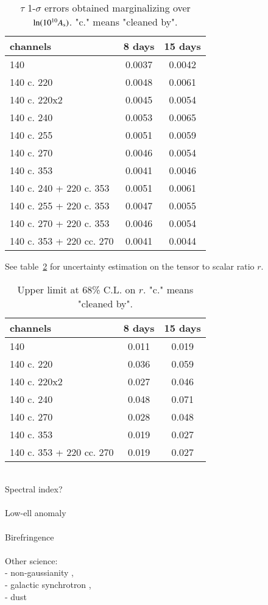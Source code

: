 \begin{table}[htp]
\begin{center}
\begin{tabular}{l|c|c}
channels & 8 days & 15 days \\
\hline
140 & 0.0037 & 0.0042\\
140 c. 220 & 0.0048 & 0.0061\\
140 c. 220x2 & 0.0045 & 0.0054\\
140 c. 240 & 0.0053 & 0.0065\\
140 c. 255 & 0.0051 & 0.0059\\
140 c. 270 & 0.0046 & 0.0054\\
140 c. 353 & 0.0041 & 0.0046\\
140 c. 240 + 220 c. 353  & 0.0051 & 0.0061\\
140 c. 255 + 220 c. 353  & 0.0047 & 0.0055\\
140 c. 270 + 220 c. 353  & 0.0046 & 0.0054\\
140 c. 353 + 220 cc. 270  & 0.0041 & 0.0044\\
\end{tabular}
\end{center}
\caption{$\tau$ 1-$\sigma$ errors obtained marginalizing over $\ln(10^{10}A_{\rm s})$. "c." means "cleaned by".
}
\label{tab:tauerrors}
\end{table}%

See table~\ref{tab:rerrors} for uncertainty estimation on the tensor to scalar ratio $r$. 

\begin{table}[htp]
\begin{center}
\begin{tabular}{l|c|c}
channels & 8 days & 15 days \\
\hline
140 & 0.011 & 0.019\\
140 c. 220 & 0.036 & 0.059\\
140 c. 220x2 & 0.027 & 0.046\\
140 c. 240 & 0.048 & 0.071\\
140 c. 270 & 0.028 & 0.048\\
140 c. 353 & 0.019 & 0.027\\
140 c. 353 + 220 cc. 270  & 0.019 & 0.027\\
\end{tabular}
\end{center}
\caption{Upper limit at 68\% C.L. on $r$. "c." means "cleaned by". 
}
\label{tab:rerrors}
\end{table}%

~\\
Spectral index?  \\ \\
Low-ell anomaly \\ \\
Birefringence  \\ \\
Other science: \\
- non-gaussianity  , \\
- galactic synchrotron , \\
- dust 

